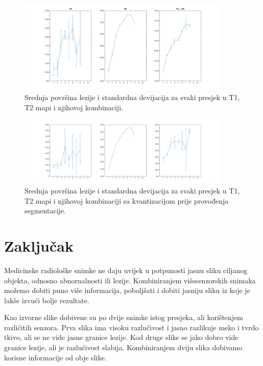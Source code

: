 \documentclass[lmodern, utf8, seminar]{fer}
\begin{document}
\begin{figure}[H]
	\centering
	\includegraphics[width=0.9\textwidth]{error}
	\caption{Srednja površina lezije i standardna devijacija za svaki presjek u T1, T2 mapi i njihovoj kombinaciji.}
	\label{fig:error}
\end{figure}

\begin{figure}[H]
	\centering
	\includegraphics[width=0.9\textwidth]{errorQuant}
	\caption{Srednja površina lezije i standardna devijacija za svaki presjek u T1, T2 mapi i njihovoj kombinaciji sa kvantizacijom prije provođenja segmentacije.}
	\label{fig:errorQuant}
\end{figure}



\chapter{Zaključak}
Medicinske radiološke snimke ne daju uvijek u potpunosti jasnu sliku ciljanog objekta, odnosno abnornalnosti ili lezije. Kombiniranjem višesenzorskih snimaka možemo dobiti puno više informacija, poboljšati i dobiti jasniju sliku iz koje je lakše izvući bolje rezultate.

Kao izvorne slike dobivene su po dvije snimke istog presjeka, ali korištenjem različitih senzora. Prva slika ima visoku razlučivost i jasno razlikuje meko i tvrdo tkivo, ali se ne vide jasne granice lezije. Kod druge slike se jako dobro vide granice lezije, ali je razlučivost slabija. Kombiniranjem dviju slika dobivamo korisne informacije od obje slike. 
\end{document}
